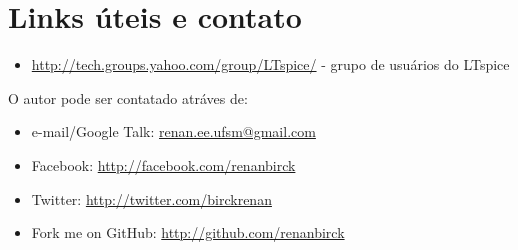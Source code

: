 \documentclass[]{report}
\begin{document}
\chapter{Links úteis e contato}
\begin{itemize}
\item \url{http://tech.groups.yahoo.com/group/LTspice/} - grupo de usuários do LTspice
\end{itemize}

O autor pode ser contatado atráves de:

\begin{itemize}
\item e-mail/Google Talk: \url{renan.ee.ufsm@gmail.com}
\item Facebook: \url{http://facebook.com/renanbirck}
\item Twitter: \url{http://twitter.com/birckrenan}
\item Fork me on GitHub: \url{http://github.com/renanbirck}
\end{itemize}



\end{document}
